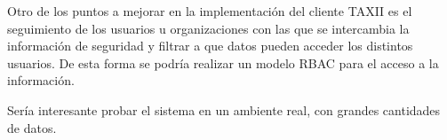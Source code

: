 \bigskip

Otro de los puntos a mejorar en la implementación del cliente TAXII es el seguimiento de los usuarios u organizaciones con las que se intercambia la información de seguridad y filtrar a que datos pueden acceder los distintos usuarios. De esta forma se podría realizar un modelo RBAC para el acceso a la información.
\bigskip

Sería interesante probar el sistema en un ambiente real, con grandes cantidades de datos.
